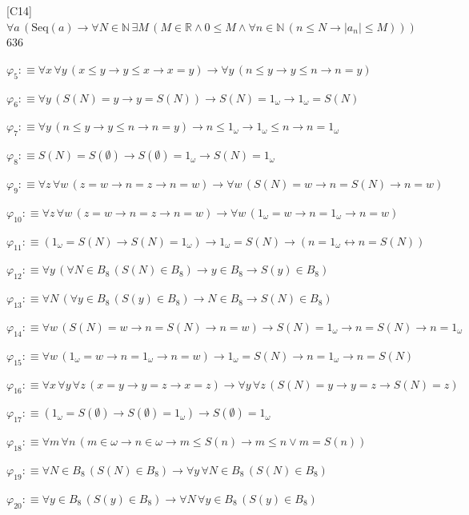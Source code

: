 \begin{fullproof}{[C14]}{$\forall a\,(\mathrm{Seq}(a) \to \forall N \in \mathbb{N}\,\exists M\,(M \in \mathbb{R} \land 0 \leq M \land \forall n \in \mathbb{N}\,(n \leq N \to \lvert a_{n} \rvert \leq M)))$}{636}
\begin{abbrevlist}
\item $\varphi_{5} :\equiv \forall x\,\forall y\,(x \leq y \to y \leq x \to x = y) \to \forall y\,(n \leq y \to y \leq n \to n = y)$
\item $\varphi_{6} :\equiv \forall y\,(S(N) = y \to y = S(N)) \to S(N) = 1_{\omega} \to 1_{\omega} = S(N)$
\item $\varphi_{7} :\equiv \forall y\,(n \leq y \to y \leq n \to n = y) \to n \leq 1_{\omega} \to 1_{\omega} \leq n \to n = 1_{\omega}$
\item $\varphi_{8} :\equiv S(N) = S(\emptyset) \to S(\emptyset) = 1_{\omega} \to S(N) = 1_{\omega}$
\item $\varphi_{9} :\equiv \forall z\,\forall w\,(z = w \to n = z \to n = w) \to \forall w\,(S(N) = w \to n = S(N) \to n = w)$
\item $\varphi_{10} :\equiv \forall z\,\forall w\,(z = w \to n = z \to n = w) \to \forall w\,(1_{\omega} = w \to n = 1_{\omega} \to n = w)$
\item $\varphi_{11} :\equiv (1_{\omega} = S(N) \to S(N) = 1_{\omega}) \to 1_{\omega} = S(N) \to (n = 1_{\omega} \leftrightarrow n = S(N))$
\item $\varphi_{12} :\equiv \forall y\,(\forall N \in B_{8}\,(S(N) \in B_{8}) \to y \in B_{8} \to S(y) \in B_{8})$
\item $\varphi_{13} :\equiv \forall N\,(\forall y \in B_{8}\,(S(y) \in B_{8}) \to N \in B_{8} \to S(N) \in B_{8})$
\item $\varphi_{14} :\equiv \forall w\,(S(N) = w \to n = S(N) \to n = w) \to S(N) = 1_{\omega} \to n = S(N) \to n = 1_{\omega}$
\item $\varphi_{15} :\equiv \forall w\,(1_{\omega} = w \to n = 1_{\omega} \to n = w) \to 1_{\omega} = S(N) \to n = 1_{\omega} \to n = S(N)$
\item $\varphi_{16} :\equiv \forall x\,\forall y\,\forall z\,(x = y \to y = z \to x = z) \to \forall y\,\forall z\,(S(N) = y \to y = z \to S(N) = z)$
\item $\varphi_{17} :\equiv (1_{\omega} = S(\emptyset) \to S(\emptyset) = 1_{\omega}) \to S(\emptyset) = 1_{\omega}$
\item $\varphi_{18} :\equiv \forall m\,\forall n\,(m \in \omega \to n \in \omega \to m \leq S(n) \to m \leq n \lor m = S(n))$
\item $\varphi_{19} :\equiv \forall N \in B_{8}\,(S(N) \in B_{8}) \to \forall y\,\forall N \in B_{8}\,(S(N) \in B_{8})$
\item $\varphi_{20} :\equiv \forall y \in B_{8}\,(S(y) \in B_{8}) \to \forall N\,\forall y \in B_{8}\,(S(y) \in B_{8})$

\end{abbrevlist}
\end{fullproof}
